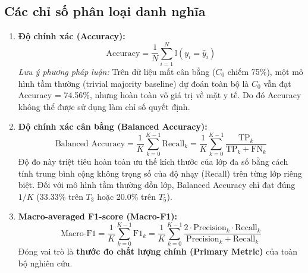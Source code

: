 \subsection{Các chỉ số phân loại danh nghĩa}
\begin{enumerate}
    \item \textbf{Độ chính xác (Accuracy):}
    \begin{equation}
        \text{Accuracy} = \frac{1}{N} \sum_{i=1}^N \mathbb{I}(y_i = \hat{y}_i)
    \end{equation}
    \textit{Lưu ý phương pháp luận:} Trên dữ liệu mất cân bằng ($C_0$ chiếm 75\%), một mô hình tầm thường (trivial majority baseline) dự đoán toàn bộ là $C_0$ vẫn đạt Accuracy = 74.56\%, nhưng hoàn toàn vô giá trị về mặt y tế. Do đó Accuracy không thể được sử dụng làm chỉ số quyết định.
    \item \textbf{Độ chính xác cân bằng (Balanced Accuracy):}
    \begin{equation}
        \text{Balanced Accuracy} = \frac{1}{K} \sum_{k=0}^{K-1} \text{Recall}_k = \frac{1}{K} \sum_{k=0}^{K-1} \frac{\text{TP}_k}{\text{TP}_k + \text{FN}_k}
    \end{equation}
    Độ đo này triệt tiêu hoàn toàn ưu thế kích thước của lớp đa số bằng cách tính trung bình cộng không trọng số của độ nhạy (Recall) trên từng lớp riêng biệt. Đối với mô hình tầm thường dồn lớp, Balanced Accuracy chỉ đạt đúng $1/K$ (33.33\% trên $T_3$ hoặc 20.0\% trên $T_5$).
    \item \textbf{Macro-averaged F1-score (Macro-F1):}
    \begin{equation}
        \text{Macro-F1} = \frac{1}{K} \sum_{k=0}^{K-1} \text{F1}_k = \frac{1}{K} \sum_{k=0}^{K-1} \frac{2 \cdot \text{Precision}_k \cdot \text{Recall}_k}{\text{Precision}_k + \text{Recall}_k}
    \end{equation}
    Đóng vai trò là \textbf{thước đo chất lượng chính (Primary Metric)} của toàn bộ nghiên cứu.
\end{enumerate}

